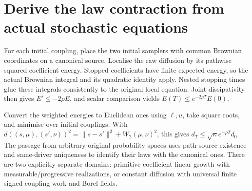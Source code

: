 \documentclass[11pt,a4paper]{report}
\begin{document}
\section{\texorpdfstring{Derive the law contraction from actual stochastic equations}{Derive the law contraction from actual stochastic equations}}


For each initial coupling, place the two initial samplers with common Brownian coordinates on a canonical source. Localise the raw diffusion by its pathwise squared coefficient energy. Stopped coefficients have finite expected energy, so the actual Brownian integral and its quadratic identity apply. Nested stopping times glue these integrals consistently to the original local equation. Joint dissipativity then gives \(E'\le-2\rho E\), and scalar comparison yields \(E(T)\le e^{-2\rho T}E(0)\).



Convert the weighted energies to Euclidean ones using \(\ell,u\), take square roots, and minimise over initial couplings. With \(d((s,\mu),(s',\nu))^2=\|s-s'\|^2+W_2(\mu,\nu)^2\), this gives \(d_T\le\sqrt\kappa e^{-\rho T}d_0\). The passage from arbitrary original probability spaces uses path-source existence and same-driver uniqueness to identify their laws with the canonical ones. There are two explicitly separate domains: primitive coefficient linear growth with measurable/\allowbreak{}progressive realizations, or constant diffusion with universal finite signed coupling work and Borel fields.
\end{document}
